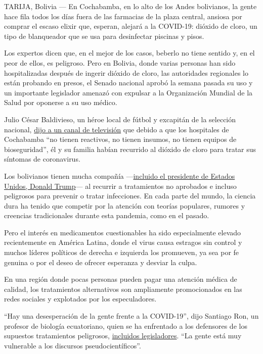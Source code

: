 TARIJA, Bolivia --- En Cochabamba, en lo alto de los Andes bolivianos,
la gente hace fila todos los días fuera de las farmacias de la plaza
central, ansiosa por comprar el escaso elixir que, esperan, alejará a la
COVID-19: dióxido de cloro, un tipo de blanqueador que se usa para
desinfectar piscinas y pisos.

Los expertos dicen que, en el mejor de los casos, beberlo no tiene
sentido y, en el peor de ellos, es peligroso. Pero en Bolivia, donde
varias personas han sido hospitalizadas después de ingerir dióxido de
cloro, las autoridades regionales lo están probando en presos, el Senado
nacional aprobó la semana pasada su uso y un importante legislador
amenazó con expulsar a la Organización Mundial de la Salud por oponerse
a su uso médico.

Julio César Baldivieso, un héroe local de fútbol y excapitán de la
selección nacional,
\href{https://www.facebookcorewwwi.onion/watch/live/?v=214675996308544\&ref=watch_permalink}{dijo
a un canal de televisión} que debido a que los hospitales de Cochabamba
``no tienen reactivos, no tienen insumos, no tienen equipos de
bioseguridad'', él y su familia habían recurrido al dióxido de cloro
para tratar sus síntomas de coronavirus.

Los bolivianos tienen mucha compañía
---\href{https://www.nytimes3xbfgragh.onion/2020/06/03/health/hydroxychloroquine-coronavirus-trump.html}{incluido
el presidente de Estados Unidos, Donald Trump}--- al recurrir a
tratamientos no aprobados e incluso peligrosos para prevenir o tratar
infecciones. En cada parte del mundo, la ciencia dura ha tenido que
competir por la atención con teorías populares, rumores y creencias
tradicionales durante esta pandemia, como en el pasado.

Pero el interés en medicamentos cuestionables ha sido especialmente
elevado recientemente en América Latina, donde el virus causa estragos
sin control y muchos líderes políticos de derecha e izquierda los
promueven, ya sea por fe genuina o por el deseo de ofrecer esperanza y
desviar la culpa.

En una región donde pocas personas pueden pagar una atención médica de
calidad, los tratamientos alternativos son ampliamente promocionados en
las redes sociales y explotados por los especuladores.

``Hay una desesperación de la gente frente a la COVID-19'', dijo
Santiago Ron, un profesor de biología ecuatoriano, quien se ha
enfrentado a los defensores de los supuestos tratamientos peligrosos,
\href{https://www.facebookcorewwwi.onion/jambato/posts/10223907884827653}{incluidos
legisladores}. ``La gente está muy vulnerable a los discursos
pseudocientíficos''.

